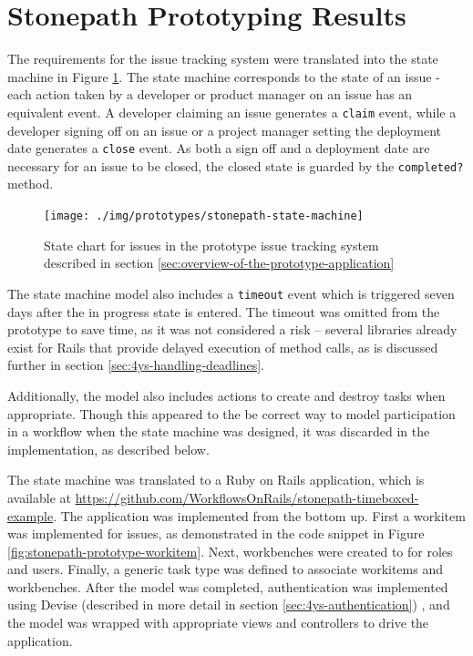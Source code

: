 \documentclass[document.tex]{subfiles}
\begin{document}
\section {Stonepath Prototyping Results}
\label {sec:stonepath-prototyping-results}

The requirements for the issue tracking system were translated into the state machine in Figure \ref{fig:stonepath-prototype-state-machine}. The state machine corresponds to the state of an issue - each action taken by a developer or product manager on an issue has an equivalent event. A developer claiming an issue generates a \verb!claim! event, while a developer signing off on an issue or a project manager setting the deployment date generates a \verb!close! event. As both a sign off and a deployment date are necessary for an issue to be closed, the closed state is guarded by the \verb!completed?! method.

\begin{figure}[!ht]
\centering \texttt{[image: ./img/prototypes/stonepath-state-machine]}
\caption{State chart for issues in the prototype issue tracking system described in section \ref{sec:overview-of-the-prototype-application}}
\label{fig:stonepath-prototype-state-machine}
\end{figure}

The state machine model also includes a \verb!timeout! event which is triggered seven days after the in progress state is entered. The timeout was omitted from the prototype to save time, as it was not considered a risk -- several libraries already exist for Rails that provide delayed execution of method calls, as is discussed further in section \ref{sec:4ys-handling-deadlines}.

Additionally, the model also includes actions to create and destroy tasks when appropriate. Though this appeared to the be correct way to model participation in a workflow when the state machine was designed, it was discarded in the implementation, as described below.

The state machine was translated to a Ruby on Rails application, which is available at \url{https://github.com/WorkflowsOnRails/stonepath-timeboxed-example}. The application was implemented from the bottom up. First a workitem was implemented for issues, as demonstrated in the code snippet in Figure \ref{fig:stonepath-prototype-workitem}. Next, workbenches were created to for roles and users. Finally, a generic task type was defined to associate workitems and workbenches. After the model was completed, authentication was implemented using Devise (described in more detail in section \ref{sec:4ys-authentication}) , and the model was wrapped with appropriate views and controllers to drive the application.
\end{document}
